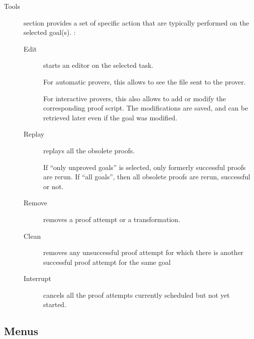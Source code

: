 \begin{description}
\item[Tools] section provides a set of specific action that are
  typically performed on the selected goal(s). :
  \begin{description}
\item[Edit] starts an editor on the selected task.

  For automatic provers, this allows to see the file sent to the
  prover.

  For interactive provers, this also allows to add or modify the
  corresponding proof script. The modifications are saved, and can be
  retrieved later even if the goal was modified.

\item[Replay] replays all the obsolete proofs.

  If ``only unproved goals'' is selected, only formerly successful
  proofs are rerun. If ``all goals'', then all obsolete proofs are
  rerun, successful or not.

\item[Remove] removes a proof attempt or a transformation.

\item[Clean] removes any unsuccessful proof attempt for which there is
  another successful proof attempt for the same goal

\item[Interrupt] cancels all the proof attempts currently scheduled
  but not yet started.
\end{description}

\end{description}

\subsection{Menus}

